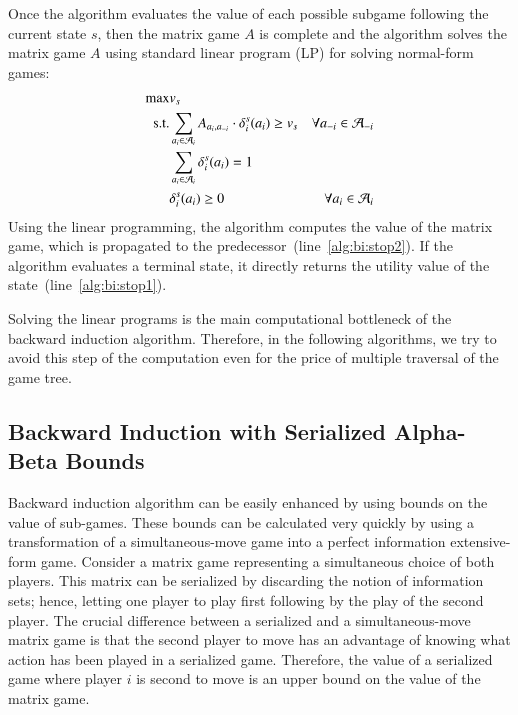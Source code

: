 Once the algorithm evaluates the value of each possible subgame following the current state $s$, then the matrix game $A$ is complete and the algorithm solves the matrix game $A$ using standard linear program (LP) for solving normal-form games:
\begin{eqnarray}
\max & v_s & \\
\textrm{s.t.} & \sum_{a_i \in \mathcal{A}_{i}}A_{a_i,a_{-i}} \cdot \delta^{s}_i(a_i) \geq v_s & \forall a_{-i} \in \mathcal{A}_{-i}\\
& \sum_{a_{i} \in \mathcal{A}_{i}} \delta^{s}_{i}(a_{i}) = 1 \\
& \delta^{s}_{i}(a_{i}) \geq 0 & \forall a_{i} \in \mathcal{A}_{i} 
\end{eqnarray}
Using the linear programming, the algorithm computes the value of the matrix game, which is propagated to the predecessor~(line~\ref{alg:bi:stop2}). 
If the algorithm evaluates a terminal state, it directly returns the utility value of the state~(line~\ref{alg:bi:stop1}).

Solving the linear programs is the main computational bottleneck of the backward induction algorithm. Therefore, in the following algorithms, we try to avoid this step of the computation even for the price of multiple traversal of the game tree.

\subsection{Backward Induction with Serialized Alpha-Beta Bounds}\label{sec:algs:biab}
Backward induction algorithm can be easily enhanced by using bounds on the value of sub-games. 
These bounds can be calculated very quickly by using a transformation of a simultaneous-move game into a perfect information extensive-form game.
Consider a matrix game representing a simultaneous choice of both players.
This matrix can be serialized by discarding the notion of information sets; hence, letting one player to play first following by the play of the second player. 
The crucial difference between a serialized and a simultaneous-move matrix game is that the second player to move has an advantage of knowing what action has been played in a serialized game.
Therefore, the value of a serialized game where player $i$ is second to move is an upper bound on the value of the matrix game. 

